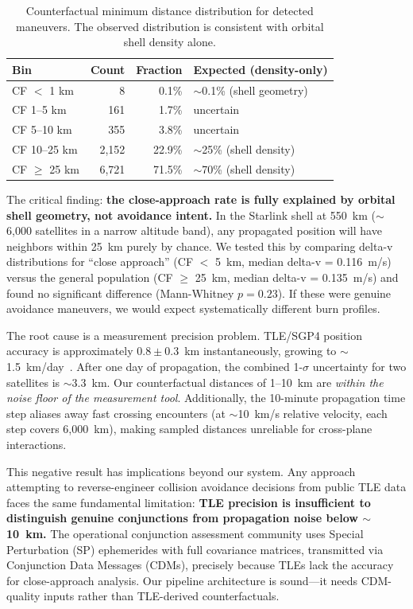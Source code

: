 \documentclass{article}
\begin{document}
\begin{table}[h]
\centering
\caption{Counterfactual minimum distance distribution for detected maneuvers. The observed distribution is consistent with orbital shell density alone.}
\label{tab:counterfactual}
\begin{tabular}{@{}lrrl@{}}
\toprule
Bin & Count & Fraction & Expected (density-only) \\
\midrule
CF $<$ 1 km & 8 & 0.1\% & $\sim$0.1\% (shell geometry) \\
CF 1--5 km & 161 & 1.7\% & uncertain \\
CF 5--10 km & 355 & 3.8\% & uncertain \\
CF 10--25 km & 2,152 & 22.9\% & $\sim$25\% (shell density) \\
CF $\geq$ 25 km & 6,721 & 71.5\% & $\sim$70\% (shell density) \\
\bottomrule
\end{tabular}
\end{table}

The critical finding: \textbf{the close-approach rate is fully explained by orbital shell geometry, not avoidance intent.} In the Starlink shell at 550~km ($\sim$6,000 satellites in a narrow altitude band), any propagated position will have neighbors within 25~km purely by chance. We tested this by comparing delta-v distributions for ``close approach'' (CF $<$ 5~km, median delta-v = 0.116~m/s) versus the general population (CF $\geq$ 25~km, median delta-v = 0.135~m/s) and found no significant difference (Mann-Whitney $p = 0.23$). If these were genuine avoidance maneuvers, we would expect systematically different burn profiles.

The root cause is a measurement precision problem. TLE/SGP4 position accuracy is approximately $0.8 \pm 0.3$~km instantaneously, growing to $\sim$1.5~km/day~\citep{levit2010}. After one day of propagation, the combined 1-$\sigma$ uncertainty for two satellites is $\sim$3.3~km. Our counterfactual distances of 1--10~km are \emph{within the noise floor of the measurement tool}. Additionally, the 10-minute propagation time step aliases away fast crossing encounters (at $\sim$10~km/s relative velocity, each step covers 6,000~km), making sampled distances unreliable for cross-plane interactions.

This negative result has implications beyond our system. Any approach attempting to reverse-engineer collision avoidance decisions from public TLE data faces the same fundamental limitation: \textbf{TLE precision is insufficient to distinguish genuine conjunctions from propagation noise below $\sim$10~km.} The operational conjunction assessment community uses Special Perturbation (SP) ephemerides with full covariance matrices, transmitted via Conjunction Data Messages (CDMs), precisely because TLEs lack the accuracy for close-approach analysis. Our pipeline architecture is sound---it needs CDM-quality inputs rather than TLE-derived counterfactuals.
\end{document}

